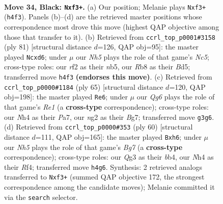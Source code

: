 \documentclass[11pt]{article}
\begin{document}
\clearpage

\begin{figure}[p]\centering
\begin{subfigure}{0.46\textwidth}\centering
\resizebox{\linewidth}{!}{%
\newchessgame
\chessboard[
  setfen={nr4k1/Q4pb1/R6B/4p3/4P2n/1r3Pq1/1P3RN1/1N4K1 b - - 0 34},
  showmover=false,
  pgfstyle=straightmove, color=movearrow, markmove={h4-f3}
]}
\caption{}
\end{subfigure}\hfill
\begin{subfigure}{0.46\textwidth}\centering
\resizebox{\linewidth}{!}{%
\newchessgame
\chessboard[
  setfen={4n1k1/4q1p1/3N2R1/1N1bpr2/pPn2r2/6RP/4QPB1/6K1 b - - 0 41},
  showmover=false,
  pgfstyle=straightmove, color=movearrow, markmove={c4-d6}
]}
\caption{}
\end{subfigure}
\\[4pt]
\begin{subfigure}{0.46\textwidth}\centering
\resizebox{\linewidth}{!}{%
\newchessgame
\chessboard[
  setfen={4r1k1/p1n2rb1/1qN3Qp/1P1pB1p1/8/4Pp1P/5P2/2RR2K1 b - - 0 33},
  showmover=false,
  pgfstyle=straightmove, color=movearrow, markmove={e8-e6}
]}
\caption{}
\end{subfigure}\hfill
\begin{subfigure}{0.46\textwidth}\centering
\resizebox{\linewidth}{!}{%
\newchessgame
\chessboard[
  setfen={3rk3/1b3rB1/4p1Qp/p4p1P/1b3R2/1qNP4/1PRK4/8 w - - 4 31},
  showmover=false,
  pgfstyle=straightmove, color=movearrow, markmove={g7-h6}
]}
\caption{}
\end{subfigure}
\caption{\textbf{Move 34, Black: \texttt{Nxf3+}.} (a) Our position; Melanie plays \texttt{Nxf3+} (\texttt{h4f3}). Panels (b)--(d) are the retrieved master positions whose correspondence most drove this move (highest QAP objective among those that transfer to it). (b) Retrieved from \texttt{ccrl\_top\_p0001\#3158} (ply 81) [structural distance $d$=126, QAP obj=95]: the master played \texttt{Ncxd6}; under $\mu$ our \emph{Nh5} plays the role of that game's \emph{Nc5}; cross-type roles: our \emph{r}f2 as their \emph{n}b5, our \emph{R}b8 as their \emph{B}d5; transferred move \texttt{h4f3} \textbf{(endorses this move)}. (c) Retrieved from \texttt{ccrl\_top\_p0000\#1184} (ply 65) [structural distance $d$=120, QAP obj=198]: the master played \texttt{Re6}; under $\mu$ our \emph{Qg6} plays the role of that game's \emph{Re1} (a \textbf{cross-type} correspondence); cross-type roles: our \emph{N}h4 as their \emph{P}a7, our \emph{n}g2 as their \emph{B}g7; transferred move \texttt{g3g6}. (d) Retrieved from \texttt{ccrl\_top\_p0000\#353} (ply 60) [structural distance $d$=111, QAP obj=165]: the master played \texttt{Bxh6}; under $\mu$ our \emph{Nh5} plays the role of that game's \emph{Bg7} (a \textbf{cross-type} correspondence); cross-type roles: our \emph{Q}g3 as their \emph{b}b4, our \emph{N}h4 as their \emph{R}f4; transferred move \texttt{h4g6}. Synthesis: 2 retrieved analogs transferred to \texttt{Nxf3+} (summed QAP objective 172, the strongest correspondence among the candidate moves); Melanie committed it via the \texttt{search} selector.}
\label{fig:thought-m67}
\end{figure}
\end{document}
